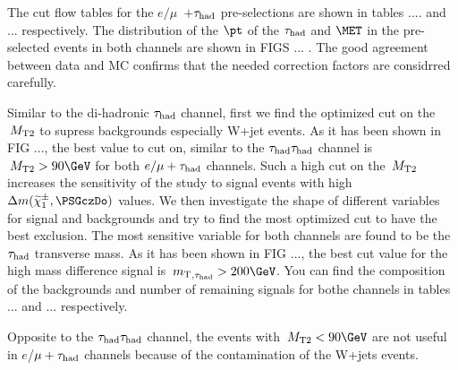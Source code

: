 The cut flow tables for the $e/\mu$ $\,+\tau_{\rm had}$ pre-selections are shown in tables .... and ... respectively. The distribution of the $\pt$ of the $\tau_{\rm had}$ and $\MET$ in the pre-selected events in both channels are shown in FIGS ... . The good agreement between data and MC confirms that the needed correction factors are considrred carefully.

Similar to the di-hadronic $\tau_{\rm had}$ channel, first we find the optimized cut on the $\,{M_{\rm T2}}$ to supress backgrounds especially W+jet events. As it has been shown in FIG ..., the best value to cut on, similar to the $\tau_{\rm had}\tau_{\rm had}$ channel is $\mttwo > 90\GeV$ for both $e/\mu+\tau_{\rm had}$ channels. Such a high cut on the $\,{M_{\rm T2}}$ increases the sensitivity of the study to signal events with high $\Delta m(\chione,\PSGczDo)$ values. We then investigate the shape of different variables for signal and backgrounds and try to find the most optimized cut to have the best exclusion. The most sensitive variable for both channels are found to be the $\tau_{\rm had}$ transverse mass. As it has been shown in FIG ..., the best cut value for the high mass difference signal is $\mt_{,\hadtau} > 200\GeV$. You can find the composition of the backgrounds and number of remaining signals for bothe channels in tables ... and ... respectively.

Opposite to the $\tau_{\rm had}\tau_{\rm had}$ channel, the events with $\mttwo<90\GeV$ are not useful in $e$/$\mu + \tau_{\rm had}$ channels because of the contamination of the W+jets events.
